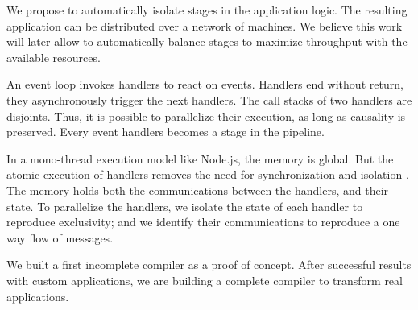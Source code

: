 We propose to automatically isolate stages in the application logic.
The resulting application can be distributed over a network of machines.
We believe this work will later allow to automatically balance stages to maximize throughput with the available resources.

An event loop invokes handlers to react on events.
Handlers end without return, they asynchronously trigger the next handlers.
The call stacks of two handlers are disjoints.
Thus, it is possible to parallelize their execution, as long as causality is preserved.
Every event handlers becomes a stage in the pipeline.

In a mono-thread execution model like Node.js, the memory is global.
But the atomic execution of handlers removes the need for synchronization and isolation \cite{Adya2002}.
The memory holds both the communications between the handlers, and their state.
To parallelize the handlers, we isolate the state of each handler to reproduce exclusivity; and we identify their communications to reproduce a one way flow of messages.

We built a first incomplete compiler as a proof of concept.
After successful results with custom applications, we are building a complete compiler to transform real applications.







